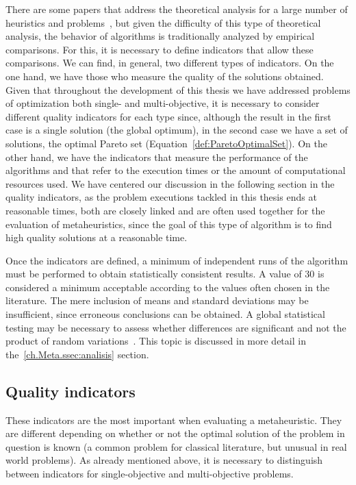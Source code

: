 There are some papers that address the theoretical analysis for a large number of heuristics and problems~\cite{graham69bounds, karp77probabilistic}, but given the difficulty of this type of theoretical analysis, the behavior of algorithms is traditionally analyzed by empirical comparisons. For this, it is necessary to define indicators that allow these comparisons. We can find, in general, two different types of indicators. On the one hand, we have those who measure the quality of the solutions obtained. Given that throughout the development of this thesis we have addressed problems of optimization both single- and multi-objective, it is necessary to consider different quality indicators for each type since, although the result in the first case is a single solution (the global optimum), in the second case we have a set of solutions, the optimal Pareto set (Equation~\ref{def:ParetoOptimalSet}). On the other hand, we have the indicators that measure the performance of the algorithms and that refer to the execution times or the amount of computational resources used. We have centered our discussion in the following section in the quality indicators, as the problem executions tackled in this thesis ends at reasonable times, both are closely linked and are often used together for the evaluation of metaheuristics, since the goal of this type of algorithm is to find high quality solutions at a reasonable time.

Once the indicators are defined, a minimum of independent runs of the algorithm must be performed to obtain statistically consistent results.
A value of 30 is considered a minimum acceptable according to the values often chosen in the literature.
The mere inclusion of means and standard deviations may be insufficient, since erroneous conclusions can be obtained. A global statistical testing may be necessary to assess whether differences are significant and not the
product of random variations~\cite{knowles06tutorial, Garcia2008}. This topic is discussed in more detail in the~\ref{ch.Meta.ssec:analisis} section.

\subsection{Quality indicators}

These indicators are the most important when evaluating a metaheuristic. They are different depending on whether or not the optimal solution of the problem in question is known (a common problem for classical literature, but unusual in real world problems). As already mentioned above, it is necessary to distinguish between indicators for single-objective and multi-objective problems.

